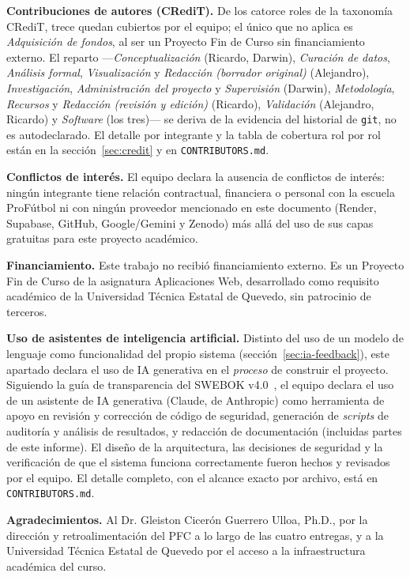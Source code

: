 \documentclass[11pt,a4paper]{article}
\newcommand{\ruta}[1]{\texttt{\footnotesize #1}}
\begin{document}
\textbf{Contribuciones de autores (CRediT).} De los catorce roles de la
taxonomía CRediT, trece quedan cubiertos por el equipo; el único que no
aplica es \emph{Adquisición de fondos}, al ser un Proyecto Fin de Curso
sin financiamiento externo. El reparto —\emph{Conceptualización}
(Ricardo, Darwin), \emph{Curación de datos}, \emph{Análisis formal},
\emph{Visualización} y \emph{Redacción (borrador original)} (Alejandro),
\emph{Investigación}, \emph{Administración del proyecto} y
\emph{Supervisión} (Darwin), \emph{Metodología}, \emph{Recursos} y
\emph{Redacción (revisión y edición)} (Ricardo), \emph{Validación}
(Alejandro, Ricardo) y \emph{Software} (los tres)— se deriva de la
evidencia del historial de \texttt{git}, no es autodeclarado. El detalle
por integrante y la tabla de cobertura rol por rol están en la
sección~\ref{sec:credit} y en \ruta{CONTRIBUTORS.md}.

\textbf{Conflictos de interés.} El equipo declara la ausencia de
conflictos de interés: ningún integrante tiene relación contractual,
financiera o personal con la escuela ProFútbol ni con ningún proveedor
mencionado en este documento (Render, Supabase, GitHub, Google/Gemini y
Zenodo) más allá del uso de sus capas gratuitas para este proyecto
académico.

\textbf{Financiamiento.} Este trabajo no recibió financiamiento externo.
Es un Proyecto Fin de Curso de la asignatura Aplicaciones Web,
desarrollado como requisito académico de la Universidad Técnica Estatal
de Quevedo, sin patrocinio de terceros.

\textbf{Uso de asistentes de inteligencia artificial.} Distinto del uso
de un modelo de lenguaje como funcionalidad del propio sistema
(sección~\ref{sec:ia-feedback}), este apartado declara el uso de IA
generativa en el \emph{proceso} de construir el proyecto. Siguiendo la
guía de transparencia del SWEBOK v4.0~\cite{swebok2024}, el equipo
declara el uso de un asistente de IA generativa (Claude, de Anthropic)
como herramienta de apoyo en revisión y corrección de código de
seguridad, generación de \emph{scripts} de auditoría y análisis de
resultados, y redacción de documentación (incluidas partes de este
informe). El diseño de la arquitectura, las decisiones de seguridad y la
verificación de que el sistema funciona correctamente fueron hechos y
revisados por el equipo. El detalle completo, con el alcance exacto por
archivo, está en \ruta{CONTRIBUTORS.md}.

\textbf{Agradecimientos.} Al Dr. Gleiston Cicerón Guerrero Ulloa, Ph.D.,
por la dirección y retroalimentación del PFC a lo largo de las cuatro
entregas, y a la Universidad Técnica Estatal de Quevedo por el acceso a
la infraestructura académica del curso.
\end{document}

